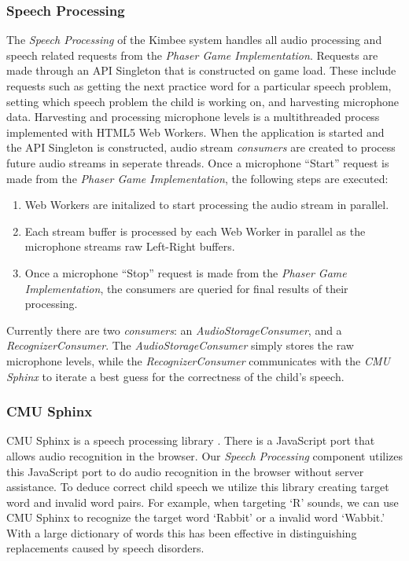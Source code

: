 \documentclass{sig-alternate-2013}
\begin{document}
\subsubsection{Speech Processing}
The {\em Speech Processing} of the Kimbee system handles all audio processing and speech related requests from the {\em Phaser Game Implementation}. Requests are made through an API Singleton that is constructed on game load. These include requests such as getting the next practice word for a particular speech problem, setting which speech problem the child is working on, and harvesting microphone data. Harvesting and processing microphone levels is a multithreaded process implemented with HTML5 Web Workers. When the application is started and the API Singleton is constructed, audio stream {\em consumers} are created to process future audio streams in seperate threads. Once a microphone ``Start'' request is made from the {\em Phaser Game Implementation}, the following steps are executed:
\vspace{-3 pt}
\begin{enumerate}
  \item Web Workers are initalized to start processing the audio stream in parallel.
  \vspace{-6 pt}
  \item Each stream buffer is processed by each Web Worker in parallel as the microphone streams raw Left-Right buffers.
  \vspace{-6 pt}
  \item Once a microphone ``Stop'' request is made from the {\em Phaser Game Implementation}, the consumers are queried for final results of their processing.
\end{enumerate}
\vspace{-3 pt}
Currently there are two {\em consumers}: an {\em AudioStorageConsumer}, and a {\em RecognizerConsumer}. The {\em AudioStorageConsumer} simply stores the raw microphone levels, while the {\em RecognizerConsumer} communicates with the {\em CMU Sphinx} to iterate a best guess for the correctness of the child's speech.

\subsubsection{CMU Sphinx}
CMU Sphinx is a speech processing library \cite{CMU:Sphinx}. There is a JavaScript port that allows audio recognition in the browser. Our {\em Speech Processing} component utilizes this JavaScript port to do audio recognition in the browser without server assistance. To deduce correct child speech we utilize this library creating target word and invalid word pairs. For example, when targeting `R' sounds, we can use CMU Sphinx to recognize the target word `Rabbit' or a invalid word `Wabbit.' With a large dictionary of words this has been effective in distinguishing replacements caused by speech disorders.
\end{document}
